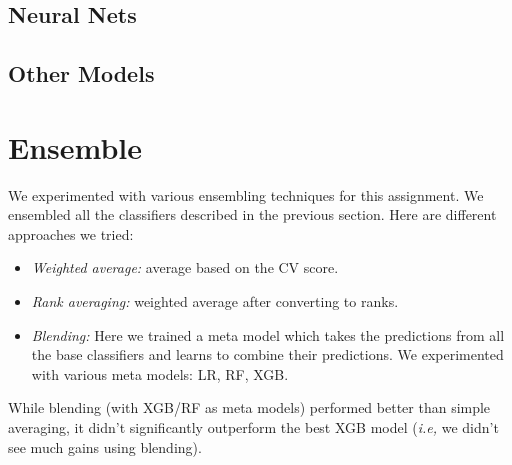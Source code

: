 \documentclass{article}
\begin{document}
\subsection{Neural Nets}
\subsection{Other Models}
\section{Ensemble}
We experimented with various ensembling techniques for this assignment. We ensembled all the classifiers described in the previous section. Here are different approaches we tried:
\begin{itemize}
\item \textit{Weighted average:} average based on the CV score.
\item \textit{Rank averaging:} weighted average after converting to ranks.
\item \textit{Blending:} Here we trained a meta model which takes the predictions from all the base classifiers and learns to combine their predictions. We experimented with various meta models: LR, RF, XGB.
\end{itemize}
While blending (with XGB/RF as meta models) performed better than simple averaging, it didn't significantly outperform the best XGB model (\textit{i.e,} we didn't see much gains using blending). 
\end{document}
